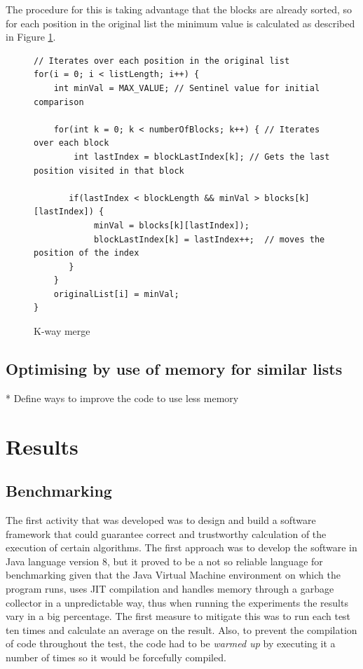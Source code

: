 \documentclass[a4paper,12pt]{article}
\begin{document}
The procedure for this is taking advantage that the blocks are already sorted, so for each position in the original list the minimum value is calculated as described in Figure \ref{kWayMerge}.

\begin{figure}[H]
\begin{small}
\begin{verbatim}
// Iterates over each position in the original list
for(i = 0; i < listLength; i++) {
    int minVal = MAX_VALUE; // Sentinel value for initial comparison

    for(int k = 0; k < numberOfBlocks; k++) { // Iterates over each block
        int lastIndex = blockLastIndex[k]; // Gets the last position visited in that block
		
       if(lastIndex < blockLength && minVal > blocks[k][lastIndex]) {
            minVal = blocks[k][lastIndex]);
            blockLastIndex[k] = lastIndex++;  // moves the position of the index
       }
    }
    originalList[i] = minVal;
}
\end{verbatim}
\end{small}
\caption{K-way merge}
\label{kWayMerge}
\end{figure}


\subsection{Optimising by use of memory for similar lists}
* Define ways to improve the code to use less memory

\section{Results}

\subsection{Benchmarking}

The first activity that was developed was to design and build a software framework that could guarantee correct and trustworthy calculation of the execution of certain algorithms. The first approach was to develop the software in Java language version 8, but it proved to be a not so reliable language for benchmarking given that the Java Virtual Machine environment on which the program runs, uses JIT  compilation and handles memory through a garbage collector in a unpredictable way, thus when running the experiments the results vary in a big percentage. The first measure to mitigate this was to run each test ten times and calculate an average on the result. Also, to prevent the compilation of code throughout the test, the code had to be {\it warmed up} by executing it a number of times so it would be forcefully compiled. 
\end{document}
